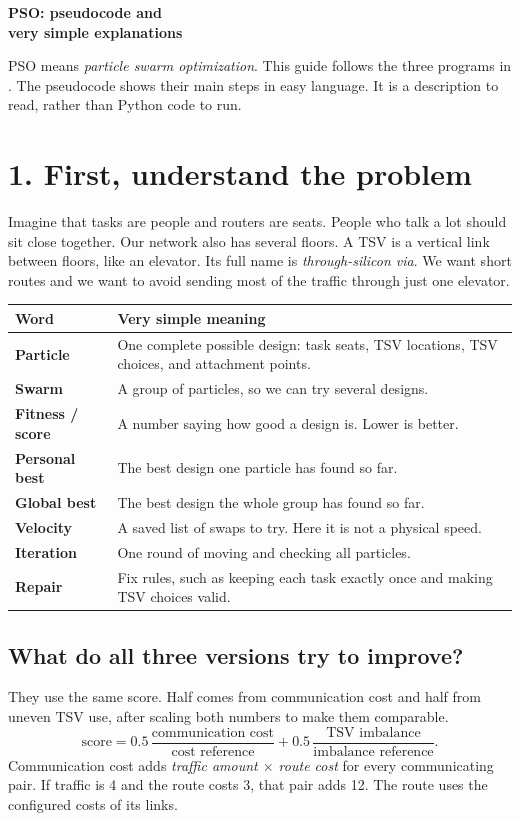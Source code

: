 \documentclass[11pt,a4paper]{article}
\begin{document}
{\sffamily\bfseries\color{Heading}\LARGE
PSO: pseudocode and\\very simple explanations\par}
\vspace{3mm}
PSO means \emph{particle swarm optimization}. This guide follows the three
programs in . The pseudocode shows
their main steps in easy language. It is a description to read, rather than
Python code to run.

\section*{1. First, understand the problem}
Imagine that tasks are people and routers are seats. People who talk a lot
should sit close together. Our network also has several floors. A TSV is a
vertical link between floors, like an elevator. Its full name is
\emph{through-silicon via}. We want short routes and we
want to avoid sending most of the traffic through just one elevator.

\begin{tabularx}{\linewidth}{@{}>{\bfseries}p{31mm}X@{}}
Word & Very simple meaning \\
\hline
Particle & One complete possible design: task seats, TSV locations,
TSV choices, and attachment points. \\
Swarm & A group of particles, so we can try several designs. \\
Fitness / score & A number saying how good a design is. Lower is better. \\
Personal best & The best design one particle has found so far. \\
Global best & The best design the whole group has found so far. \\
Velocity & A saved list of swaps to try. Here it is not a physical speed. \\
Iteration & One round of moving and checking all particles. \\
Repair & Fix rules, such as keeping each task exactly once and making TSV
choices valid. \\
\end{tabularx}

\subsection*{What do all three versions try to improve?}
They use the same score. Half comes from communication cost and half from
uneven TSV use, after scaling both numbers to make them comparable.
\[
\text{score}=0.5\,\frac{\text{communication cost}}{\text{cost reference}}
 +0.5\,\frac{\text{TSV imbalance}}{\text{imbalance reference}}.
\]
Communication cost adds \emph{traffic amount $\times$ route cost} for every
communicating pair. If traffic is 4 and the route costs 3, that pair adds 12.
The route uses the configured costs of its links.
\end{document}
